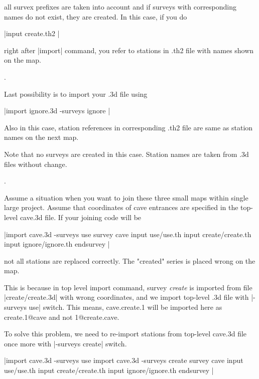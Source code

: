  all survex prefixes are taken into account and if surveys with
 corresponding names do not exist, they are created. In this case,
 if you do


|input create.th2
|


 right after |import| command, you refer to stations in .th2
 file with names shown on the map.





.


 Last possibility is to import your .3d file using


|import ignore.3d -surveys ignore
|


 Also in this case, station references in corresponding .th2 file
 are same as station names on the next map.







 Note that no surveys are created in this case. Station names
 are taken from .3d files without change.


.


 Assume a situation when you want to join these three small maps
 within single large project. Assume that coordinates of cave
 entrances are specified in the top-level cave.3d file. If your
 joining code will be


|import cave.3d -surveys use
survey cave
  input use/use.th
  input create/create.th
  input ignore/ignore.th
endsurvey
|


 not all stations are replaced correctly. The "created" series
 is placed wrong on the map.







 This is because in top level import command, survey {\it create} is
 imported from file |create/create.3d| with wrong coordinates,
 and we import top-level .3d file with |-surveys use| switch.
 This means, cave.create.1 will be imported here as create.1@cave and not
 1@create.cave.




 To solve this problem, we need to re-import stations
 from top-level cave.3d file once more with |-surveys create|
 switch.


|import cave.3d -surveys use
import cave.3d -surveys create
survey cave
  input use/use.th
  input create/create.th
  input ignore/ignore.th  
endsurvey
|


